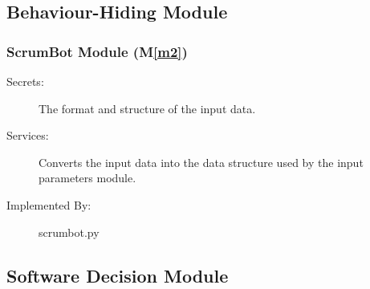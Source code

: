 \documentclass[12pt, titlepage]{article}
\newcommand{\mref}[1]{M\ref{#1}}
\begin{document}
\subsection{Behaviour-Hiding Module}



\subsubsection{ScrumBot Module (\mref{m2})}
\begin{description}
    \item[Secrets:] The format and structure of the input data.
    \item[Services:] Converts the input data into the data structure used by the input parameters module.
    \item[Implemented By:] scrumbot.py
\end{description}

\subsection{Software Decision Module}
\end{document}
